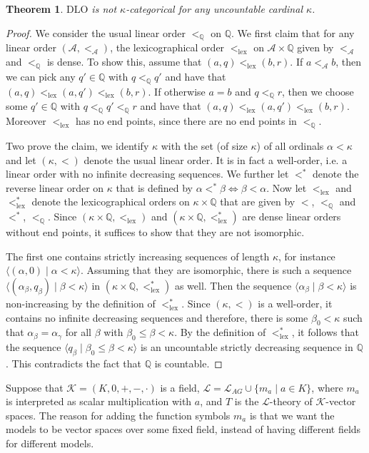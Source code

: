 \documentclass[10pt]{amsart}
\renewcommand{\L}{\mathcal{L}}
\newcommand{\QQ}{\mathbb{Q}}
\newcommand{\KK}{\mathcal{K}}
\renewcommand{\AA}{\mathcal{A}}
\newcommand{\DLO}{\mathrm{DLO}}
\newcommand{\lex}{\mathrm{lex}}
\newtheorem{theorem}{Theorem}[subsection]
\theoremstyle{definition}
\theoremstyle{remark}
\begin{document}
\begin{theorem} 
$\DLO$ is not $\kappa$-categorical for any uncountable cardinal $\kappa$. 
\end{theorem} 
\begin{proof} 
We consider the usual linear order $<_\QQ$ on $\QQ$. We first claim that for any linear order $(\AA,<_\AA)$, the lexicographical order $<_\lex$ on $\AA\times \QQ$ given by $<_\AA$ and $<_\QQ$ is dense. To show this, assume that $(a,q)<_\lex (b,r)$. If $a<_\AA b$, then we can pick any $q'\in \QQ$ with $q<_\QQ q'$ and have that $(a,q)<_\lex(a,q')<_\lex(b,r)$. If otherwise $a= b$ and $q<_\QQ r$, then we choose some $q'\in\QQ$ with $q<_\QQ q'<_\QQ r$ and have that $(a,q)<_\lex(a,q')<_\lex(b,r)$. Moreover $<_\lex$ has no end points, since there are no end points in $<_\QQ$. 

Two prove the claim, we identify $\kappa$ with the set (of size $\kappa$) of all ordinals $\alpha<\kappa$ and let $(\kappa,<)$ denote the usual linear order. It is in fact a well-order, i.e. a linear order with no infinite decreasing sequences. We further let $<^*$ denote the reverse linear order on $\kappa$ that is defined by $\alpha<^*\beta\Leftrightarrow \beta<\alpha$. Now let $<_\lex$ and $<^*_\lex$ denote the lexicographical orders on $\kappa\times \QQ$ that are given by $<$, $<_\QQ$ and  $<^*$, $<_\QQ$. Since $(\kappa\times \QQ, <_\lex)$ and $(\kappa\times \QQ, <_\lex^*)$ are dense linear orders without end points, it suffices to show that they are not isomorphic. 

The first one contains strictly increasing sequences of length $\kappa$, for instance $\langle(\alpha,0)\mid \alpha<\kappa\rangle$. Assuming that they are isomorphic, there is such a sequence $\langle (\alpha_\beta,q_\beta)\mid \beta<\kappa\rangle$ in $(\kappa\times \QQ, <_\lex^*)$ as well. Then the sequence $\langle \alpha_\beta\mid \beta<\kappa\rangle$ is non-increasing by the definition of $<_\lex^*$. Since $(\kappa,<)$ is a well-order, it contains no infinite decreasing sequences and therefore, there is some $\beta_0<\kappa$ such that $\alpha_\beta=\alpha_\gamma$ for all $\beta$ with $\beta_0\leq \beta<\kappa$. By the definition of $<_\lex^*$, it follows that the sequence $\langle q_\beta\mid \beta_0\leq \beta<\kappa\rangle$ is an uncountable strictly decreasing sequence in $\QQ$. This contradicts the fact that $\QQ$ is countable. 
\end{proof} 

Suppose that $\KK=(K,0,+,-,\cdot)$ is a field, $\L=\L_{AG}\cup\{m_a\mid a\in K\}$, where $m_a$ is interpreted as scalar multiplication with $a$, and $T$ is the $\L$-theory of $\KK$-vector spaces. The reason for adding the function symbols $m_a$ is that we want the models to be vector spaces over some fixed field, instead of having different fields for different models. 
\end{document}
